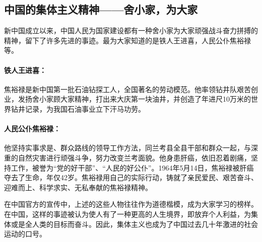 \subsection{中国的集体主义精神——舍小家，为大家}
\par
新中国成立以来，中国人民为国家建设都有一种舍小家为大家顽强战斗奋力拼搏的精神，留下了许多先进的事迹。最为大家知道的是铁人王进喜，人民公仆焦裕禄等。

\paragraph{铁人王进喜：}
焦裕禄是新中国第一批石油钻探工人，全国著名的劳动模范。他率领钻井队艰苦创业，发扬舍小家顾大家精神，打出来大庆第一块油井，并创造了年进尺10万米的世界钻井记录，为我国石油事业立下汗马功劳。
\paragraph{人民公仆焦裕禄：}
他坚持实事求是、群众路线的领导工作方法，同兰考县全县干部和群众一起，与深重的自然灾害进行顽强斗争，努力改变兰考面貌。他身患肝癌，依旧忍着剧痛，坚持工作，被誉为“党的好干部”、“人民的好公仆”。1964年5月14日，焦裕禄被肝癌夺去了生命，年仅42岁。焦裕禄用自己的实际行动，铸就了亲民爱民、艰苦奋斗、迎难而上、科学求实、无私奉献的焦裕禄精神。
\vspace{1em}
\par
在中国官方的宣传中，上述的这些人物往往作为道德楷模，成为大家学习的榜样。在中国，这样的事迹被认为使人有了一种更高的人生境界，即放弃个人利益，为集体或是全人类的目标而奋斗。因此，集体主义也成为了中国过去几十年激进的社会运动的口号。
